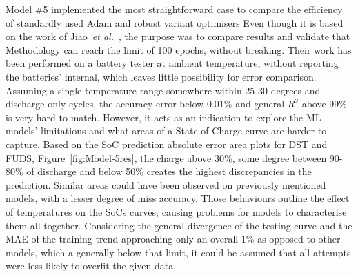 %
%
Model \#5 implemented the most straightforward case to compare the efficiency of standardly used Adam and robust variant optimisers%
Even though it is based on the work of Jiao~\textit{et al.}~\cite{jiao_gru-rnn_2020}, the purpose was to compare results and validate that Methodology can reach the limit of 100 epochs, without breaking.
Their work has been performed on a battery tester at ambient temperature, without reporting the batteries' internal, which leaves little possibility for error comparison.
Assuming a single temperature range somewhere within 25-30 degrees and discharge-only cycles, the accuracy error below 0.01\% and general $R^2$ above 99\% is very hard to match.
However, it acts as an indication to explore the ML models' limitations and what areas of a State of Charge curve are harder to capture.
Based on the SoC prediction absolute error area plots for DST and FUDS, Figure~\ref{fig:Model-5res}, the charge above 30\%, some degree between 90-80\% of discharge and below 50\% creates the highest discrepancies in the prediction.
Similar areas could have been observed on previously mentioned models, with a lesser degree of miss accuracy.
Those behaviours outline the effect of temperatures on the SoCs curves, causing problems for models to characterise them all together.
Considering the general divergence of the testing curve and the MAE of the training trend approaching only an overall 1\% as opposed to other models, which a generally below that limit, it could be assumed that all attempts were less likely to overfit the given data.

